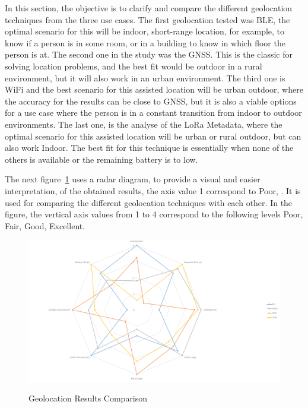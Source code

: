 In this section, the objective is to clarify and compare the different geolocation techniques from the three use cases. The first geolocation tested was BLE, the optimal scenario for this will be indoor, short-range location, for example, to know if a person is in some room, or in a building to know in which floor the person is at. The second one in the study was the GNSS. This is the classic for solving location problems, and the best fit would be outdoor in a rural environment, but it will also work in an urban environment. The third one is WiFi and the best scenario for this assisted location will be urban outdoor, where the accuracy for the results can be close to GNSS, but it is also a viable options for a use case where the person is in a constant transition from indoor to outdoor environments. The last one, is the analyse of the LoRa Metadata, where the optimal scenario for this assisted location will be urban or rural outdoor, but can also work Indoor. The best fit for this technique is essentially when none of the others is available or the remaining battery is to low.

The next figure~\ref{fig:radar1} uses a radar diagram, to provide a visual and easier interpretation, of the obtained results, the axis value 1 correspond to Poor, . It is used for  comparing the different geolocation techniques with each other. In the figure, the vertical axis values from 1 to 4 correspond to the following levels Poor, Fair, Good, Excellent.
\begin{figure}[htbp]
  \centering
  
    {\includegraphics[width=\linewidth]{Chapters/Figures/radarfinal3.pdf}}%
 
  \caption{Geolocation Results Comparison}
  \label{fig:radar1}
\end{figure}

